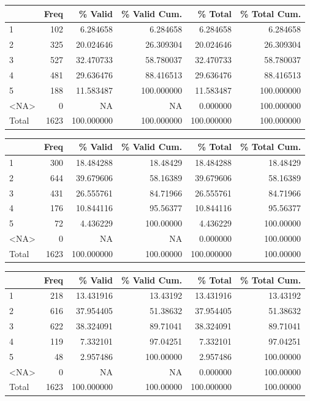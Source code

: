 \documentclass[
  letterpaper,
  DIV=11,
  numbers=noendperiod]{scrartcl}
\begin{document}
\begin{table}
\begin{tabular}[t]{l|r|r|r|r|r}
\hline
  & Freq & \% Valid & \% Valid Cum. & \% Total & \% Total Cum.\\
\hline
1 & 102 & 6.284658 & 6.284658 & 6.284658 & 6.284658\\
\hline
2 & 325 & 20.024646 & 26.309304 & 20.024646 & 26.309304\\
\hline
3 & 527 & 32.470733 & 58.780037 & 32.470733 & 58.780037\\
\hline
4 & 481 & 29.636476 & 88.416513 & 29.636476 & 88.416513\\
\hline
5 & 188 & 11.583487 & 100.000000 & 11.583487 & 100.000000\\
\hline
<NA> & 0 & NA & NA & 0.000000 & 100.000000\\
\hline
Total & 1623 & 100.000000 & 100.000000 & 100.000000 & 100.000000\\
\hline
\end{tabular}
\centering
\begin{tabular}[t]{l|r|r|r|r|r}
\hline
  & Freq & \% Valid & \% Valid Cum. & \% Total & \% Total Cum.\\
\hline
1 & 300 & 18.484288 & 18.48429 & 18.484288 & 18.48429\\
\hline
2 & 644 & 39.679606 & 58.16389 & 39.679606 & 58.16389\\
\hline
3 & 431 & 26.555761 & 84.71966 & 26.555761 & 84.71966\\
\hline
4 & 176 & 10.844116 & 95.56377 & 10.844116 & 95.56377\\
\hline
5 & 72 & 4.436229 & 100.00000 & 4.436229 & 100.00000\\
\hline
<NA> & 0 & NA & NA & 0.000000 & 100.00000\\
\hline
Total & 1623 & 100.000000 & 100.00000 & 100.000000 & 100.00000\\
\hline
\end{tabular}
\centering
\begin{tabular}[t]{l|r|r|r|r|r}
\hline
  & Freq & \% Valid & \% Valid Cum. & \% Total & \% Total Cum.\\
\hline
1 & 218 & 13.431916 & 13.43192 & 13.431916 & 13.43192\\
\hline
2 & 616 & 37.954405 & 51.38632 & 37.954405 & 51.38632\\
\hline
3 & 622 & 38.324091 & 89.71041 & 38.324091 & 89.71041\\
\hline
4 & 119 & 7.332101 & 97.04251 & 7.332101 & 97.04251\\
\hline
5 & 48 & 2.957486 & 100.00000 & 2.957486 & 100.00000\\
\hline
<NA> & 0 & NA & NA & 0.000000 & 100.00000\\
\hline
Total & 1623 & 100.000000 & 100.00000 & 100.000000 & 100.00000\\
\hline
\end{tabular}
\end{table}
\end{document}

